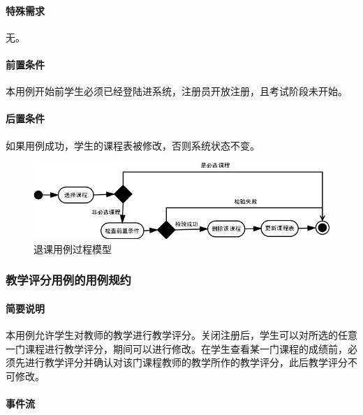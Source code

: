 \paragraph{特殊需求}
  
无。
  
\paragraph{前置条件}
  
本用例开始前学生必须已经登陆进系统，注册员开放注册，且考试阶段未开始。
  
\paragraph{后置条件}
  
如果用例成功，学生的课程表被修改，否则系统状态不变。

\begin{figure}[H]
  \centering
  \includegraphics[scale=0.7]{img/jwxt_dcourse.png}
  \caption{退课用例过程模型}
\end{figure}

\subsubsection{教学评分用例的用例规约}

\paragraph{简要说明}
  
本用例允许学生对教师的教学进行教学评分。关闭注册后，学生可以对所选的任意一门课程进行教学评分，期间可以进行修改。在学生查看某一门课程的成绩前，必须先进行教学评分并确认对该门课程教师的教学所作的教学评分，此后教学评分不可修改。
  
\paragraph{事件流}
  
